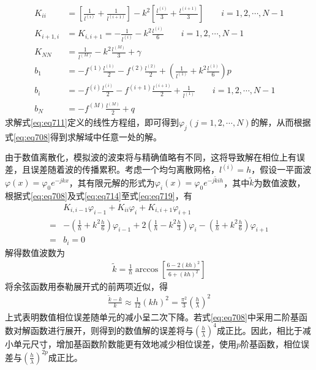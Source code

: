 \documentclass{article}
\numberwithin{equation}{section}
\begin{document}
\begin{align}
    \label{eq:eq714}
    K_{ii}&=\left[\frac{1}{l^{(i)}}+\frac{1}{l^{(i+1)}}\right]-k^2\left[\frac{l^{(i)}}{3}+\frac{l^{(i+1)}}{3}\right]\qquad i=1,2,\cdots,N-1 \\
    \label{eq:eq715}
    K_{i+1,i}&=K_{i,i+1}=-\frac{1}{l^{(i)}}-k^2\frac{l^{(i)}}{6}\qquad i=1,2,\cdots,N-1 \\
    \label{eq:eq716}
    K_{NN}&=\frac{1}{l^{(M)}}-k^2\frac{l^{(M)}}{3}+\gamma \\
    \label{eq:eq717}
    b_1&=-f^{(1)}\frac{l^{(1)}}{2}-f^{(2)}\frac{l^{(2)}}{2}+\left(\frac{1}{l^{(1)}}+k^2\frac{l^{(1)}}{6}\right)p \\
    \label{eq:eq718}
    b_i&=-f^{(i)}\frac{l^{(i)}}{2}-f^{(i+1)}\frac{l^{(i+1)}}{2}+\frac{1}{l^{(1)}}\qquad i=1,2,\cdots,N-1 \\
    \label{eq:eq719}
    b_N&=-f^{(M)}\frac{l^{(M)}}{2}+q
\end{align}
求解式\ref{eq:eq711}定义的线性方程组，即可得到$\varphi_j(j=1,2,\cdots,N)$的解，从而根据式\ref{eq:eq708}得到求解域中任意一处的解。\par
由于数值离散化，模拟波的波束将与精确值略有不同，这将导致解在相位上有误差，且误差随着波的传播累积。考虑一个均匀离散网格，$l^{(i)}=h$，假设一平面波$\varphi(x)=\varphi_0e^{-jkx}$，其有限元解的形式为$\varphi_i(x)=\varphi_0e^{-j\tilde{k}ih}$，其中$\tilde{k}$为数值波数，根据式\ref{eq:eq708}及式\ref{eq:eq714}至式\ref{eq:eq719}，有
\begin{align}
    \label{eq:eq720}
    &K_{i,i-1}\varphi_{i-1}+K_{ii}\varphi_{i}+K_{i,i+1}\varphi_{i+1} \nonumber \\
    =&-\left(\frac{1}{h}+k^2\frac{h}{6}\right)\varphi_{i-1}+2\left(\frac{1}{h}-k^2\frac{h}{3}\right)\varphi_{i}-\left(\frac{1}{h}+k^2\frac{h}{6}\right)\varphi_{i+1} \nonumber \\
    =&b_i=0
\end{align}
解得数值波数为
\begin{align}
    \label{eq:eq721}
    \tilde{k}=\frac{1}{h}\arccos\left[\frac{6-2(kh)^2}{6+(kh)^2}\right]
\end{align}
将余弦函数用泰勒展开式的前两项近似，得
\begin{align}
    \label{eq:eq722}
    \frac{\tilde{k}-k}{k}\approx\frac{1}{12}(kh)^2=\frac{\pi^2}{3}\left(\frac{h}{\lambda}\right)^2
\end{align}
上式表明数值相位误差随单元的减小呈二次下降。若式\ref{eq:eq708}中采用二阶基函数对解函数进行展开，则得到的数值解的误差将与$(\frac{h}{\lambda})^4$成正比。因此，相比于减小单元尺寸，增加基函数阶数能更有效地减少相位误差，使用$p$阶基函数，相位误差与$(\frac{h}{\lambda})^{2p}$成正比。
\end{document}
